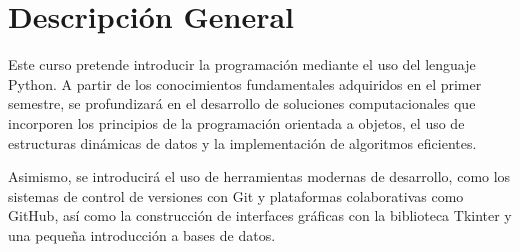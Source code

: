 \section{Descripción General}

Este curso pretende introducir la programación mediante el uso del lenguaje Python.
A partir de los conocimientos fundamentales adquiridos en el primer semestre, se profundizará en el desarrollo de soluciones computacionales que incorporen los principios de la programación orientada a objetos, el uso de estructuras dinámicas de datos y la implementación de algoritmos eficientes.

Asimismo, se introducirá el uso de herramientas modernas de desarrollo, como los sistemas de control de versiones con Git y plataformas colaborativas como GitHub, así como la construcción de interfaces gráficas con la biblioteca Tkinter y una pequeña introducción a bases de datos.
